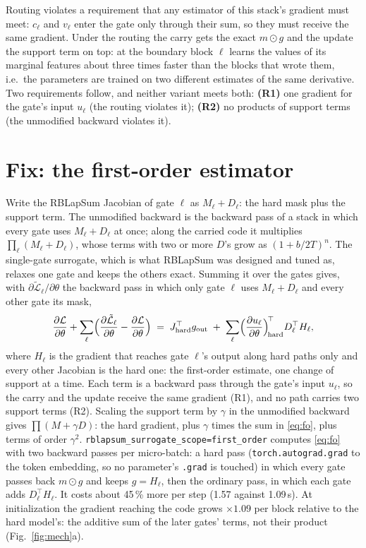 \documentclass[10pt,a4paper]{article}
\newcommand{\code}[1]{\texttt{#1}}
\begin{document}
Routing violates a requirement that any estimator of this stack's gradient must meet: \(c_\ell\) and \(v_\ell\) enter
the gate only through their sum, so they must receive the same gradient.  Under the routing the carry gets the
exact \(m\odot g\) and the update the support term on top: at the boundary block \(\ell\) learns the values of its
marginal features about three times faster than the blocks that wrote them, i.e.\ the parameters are trained on two
different estimates of the same derivative.  Two requirements follow, and neither variant meets both:
\textbf{(R1)} one gradient for the gate's input \(u_\ell\) (the routing violates it); \textbf{(R2)} no products of support
terms (the unmodified backward violates it).

\section{Fix: the first-order estimator}

Write the RBLapSum Jacobian of gate \(\ell\) as \(M_\ell+D_\ell\): the hard mask plus the support term.  The
unmodified backward is the backward pass of a stack in which every gate uses \(M_\ell+D_\ell\) at once; along the
carried code it multiplies \(\prod_\ell(M_\ell+D_\ell)\), whose terms with two or more \(D\)'s grow as \((1+b/2T)^n\).  The single-gate
surrogate, which is what RBLapSum was designed and tuned as, relaxes one gate and keeps the others exact.  Summing
it over the gates gives, with \(\partial\tilde{\mathcal L}_\ell/\partial\theta\) the backward pass in which only gate
\(\ell\) uses \(M_\ell+D_\ell\) and every other gate its mask,
\begin{equation}
  \frac{\partial\mathcal L}{\partial\theta}+\sum_\ell\Bigl(\frac{\partial\tilde{\mathcal L}_\ell}{\partial\theta}-\frac{\partial\mathcal L}{\partial\theta}\Bigr)
  \;=\;J_{\rm hard}^\top g_{\rm out}
  \;+\;\sum_\ell\Bigl(\frac{\partial u_\ell}{\partial\theta}\Bigr)^{\!\top}_{\!\rm hard}D_\ell^\top H_\ell ,
  \label{eq:fo}
\end{equation}
where \(H_\ell\) is the gradient that reaches gate \(\ell\)'s output along hard paths only and every other Jacobian is the
hard one: the first-order estimate, one change of support at a time.  Each term is a backward pass through the gate's
input \(u_\ell\), so the carry and the update receive the same gradient (R1), and no path carries two support terms
(R2).
Scaling the support term by \(\gamma\) in the unmodified backward gives \(\prod(M+\gamma D)\): the hard gradient, plus
\(\gamma\) times the sum in \eqref{eq:fo}, plus terms of order \(\gamma^2\).  \code{rblapsum\_surrogate\_scope=first\_order} computes \eqref{eq:fo} with two backward passes per
micro-batch: a hard pass (\code{torch.autograd.grad} to the token embedding, so no parameter's \texttt{.grad} is
touched) in which every gate passes back \(m\odot g\) and keeps \(g=H_\ell\), then the ordinary pass, in which each gate
adds \(D_\ell^\top H_\ell\).  It costs about 45\,\% more per step (1.57 against 1.09\,s).  At initialization the gradient
reaching the code grows \(\times1.09\) per block relative to the hard model's: the additive sum of the later gates'
terms, not their product (Fig.~\ref{fig:mech}a).
\end{document}
